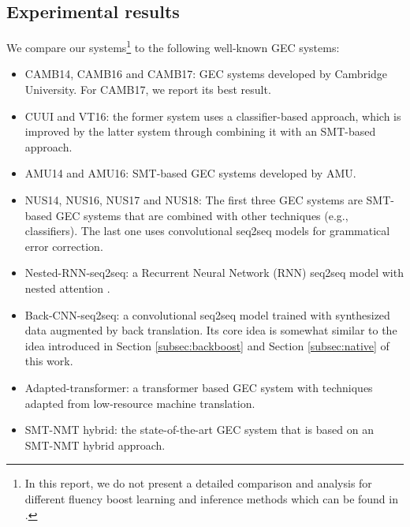 \documentclass{article} \usepackage{MSRA_TR,times}
\begin{document}
\subsection{Experimental results}

We compare our systems\footnote{In this report, we do not present a detailed comparison and analysis for different fluency boost learning and inference methods which can be found in \cite{ge2018fluency}.} to the following well-known GEC systems:

\leftmargini=5mm
\begin{itemize}

\item CAMB14, CAMB16 and CAMB17: GEC systems \citep{felice2014grammatical,yuan2016grammatical,yannakoudakis2017neural} developed by Cambridge University. For CAMB17, we report its best result.
\item CUUI and VT16: the former system \citep{rozovskaya2014illinois} uses a classifier-based approach, which is improved by the latter system \citep{rozovskaya2016grammatical} through combining it with an SMT-based approach.
\item AMU14 and AMU16: SMT-based GEC systems \citep{junczys2014amu,junczys2016phrase} developed by AMU.
\item NUS14, NUS16, NUS17 and NUS18: The first three GEC systems \citep{Susanto2014System,chollampatt2016adapting,chollampatt-ng:2017:BEA} are SMT-based GEC systems that are combined with other techniques (e.g., classifiers). The last one \citep{chollampatt2018} uses convolutional seq2seq models for grammatical error correction.
\item Nested-RNN-seq2seq: a Recurrent Neural Network (RNN) seq2seq model with nested attention \citep{ji2017nested}.
\item Back-CNN-seq2seq: a convolutional seq2seq model \citep{xie2018noising} trained with synthesized data augmented by back translation. Its core idea is somewhat similar to the idea introduced in Section \ref{subsec:backboost} and Section \ref{subsec:native} of this work.
\item Adapted-transformer: a transformer \citep{vaswani2017attention} based GEC system \citep{junczys2018approaching} with techniques adapted from low-resource machine translation.
\item SMT-NMT hybrid: the state-of-the-art GEC system \citep{grundkiewicz2018near} that is based on an SMT-NMT hybrid approach.
\end{itemize}
\end{document}
